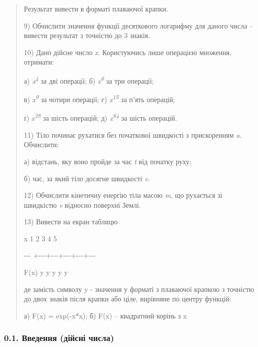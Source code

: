 \documentclass[]{article}
\begin{document}
\begin{quote}
Результат вивести в форматі плаваючої крапки.

9) Обчислити значення функції десяткового логарифму для даного числа --
вивести результат з точністю до 3 знаків.

10) Дано дійсне число \emph{x}. Користуючись лише операцією множення,
отримати:

а) \emph{x\textsuperscript{4}} за дві операції; б)
\emph{x\textsuperscript{6}} за три операції;

в) \emph{x\textsuperscript{9}} за чотири операції; г)
\emph{x\textsuperscript{15}} за п'ять операцій;

ґ) \emph{x\textsuperscript{28}} за шість операцій; д)
\emph{x\textsuperscript{64}} за шість операцій.

11) Тіло починає рухатися без початкової швидкості з прискоренням
\emph{a}. Обчислити:

а) відстань, яку воно пройде за час \emph{t} від початку руху;

б) час, за який тіло досягне швидкості \emph{v}.

12) Обчислити кінетичну енергію тіла масою \emph{m}, що рухається зі
швидкістю \emph{v} відносно поверхні Землі.

13) Вивести на екран таблицю

x \textbar{} 1 \textbar{} 2 \textbar{} 3 \textbar{} 4 \textbar{} 5

-\/-\/- +-\/-\/-+-\/-\/-+-\/-\/-+-\/-\/-+-\/-\/-

F(x)\textbar{} y \textbar{} y \textbar{} y \textbar{} y \textbar{} y

де замість символу y - значення у форматі з плаваючої крапкою з точністю
до двох знаків після крапки або ціле, вирівняне по центру функцій:

а) F(x) = exp(-x*x); б) F(x) -- квадратний корінь з x
\end{quote}

\subsubsection{0.1. Введення (дійсні
числа)}\label{ux432ux432ux435ux434ux435ux43dux43dux44f-ux434ux456ux439ux441ux43dux456-ux447ux438ux441ux43bux430}
\end{document}

